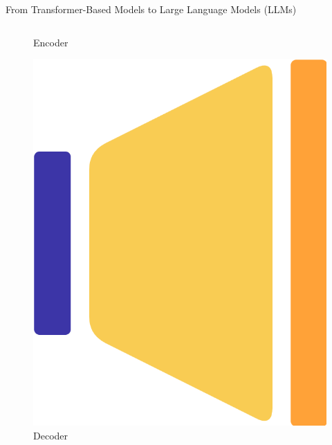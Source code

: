 \documentclass[11pt,aspectratio=169]{beamer}
\begin{document}
\begin{frame}{From Transformer-Based Models to Large Language Models (LLMs)}
\begin{columns}
\begin{column}{0.3\linewidth}
\begin{figure}
            \caption{\centering\footnotesize Encoder}
        \end{figure}
        \vspace{-0.6cm}
        \begin{figure}
            \includegraphics[width=0.24\linewidth]{ed_decoder_only.png}
            \caption{\centering\footnotesize Decoder}
        \end{figure}
    \end{column}
\end{columns}
\end{frame}
\end{document}
